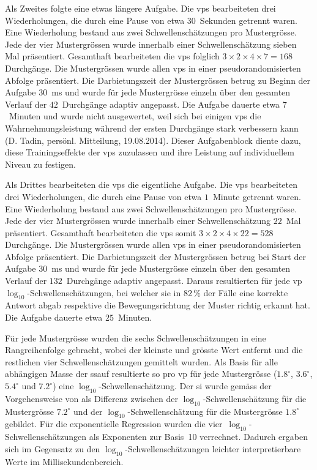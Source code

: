 \documentclass[11pt, twoside, a4paper]{book}		%
\begin{document}
Als Zweites folgte eine etwas längere Aufgabe. Die \glspl{vp} bearbeiteten drei Wiederholungen, die durch eine Pause von etwa $30$~Sekunden getrennt waren. Eine Wiederholung  bestand aus zwei Schwellenschätzungen pro Mustergrösse. Jede der vier Mustergrössen wurde innerhalb einer Schwellenschätzung sieben Mal präsentiert. Gesamthaft bearbeiteten die \glspl{vp} folglich $3 \times 2 \times 4 \times 7 = 168$ Durchgänge. Die Mustergrössen wurde allen \glspl{vp} in einer pseudorandomisierten Abfolge präsentiert. Die Darbietungszeit der Mustergrössen betrug zu Beginn der Aufgabe $30$~ms und wurde für jede Mustergrösse einzeln über den gesamten Verlauf der $42$~Durchgänge adaptiv angepasst. Die Aufgabe dauerte etwa $7$~Minuten und wurde nicht ausgewertet, weil sich bei einigen \glspl{vp} die Wahrnehmungsleistung während der ersten Durchgänge stark verbessern kann (D. Tadin, persönl. Mitteilung, 19.08.2014). Dieser Aufgabenblock diente dazu, diese Trainingseffekte der \glspl{vp} zuzulassen und ihre Leistung auf individuellem Niveau zu festigen. 

Als Drittes bearbeiteten die \glspl{vp} die eigentliche Aufgabe. Die \glspl{vp} bearbeiteten drei Wiederholungen, die durch eine Pause von etwa $1$~Minute getrennt waren. Eine Wiederholung  bestand aus zwei Schwellenschätzungen pro Mustergrösse. Jede der vier Mustergrössen wurde innerhalb einer Schwellenschätzung $22$~Mal präsentiert. Gesamthaft bearbeiteten die \glspl{vp} somit $3 \times 2 \times 4 \times 22 = 528$ Durchgänge. Die Mustergrössen wurde allen \glspl{vp} in einer pseudorandomisierten Abfolge präsentiert. Die Darbietungszeit der Mustergrössen betrug bei Start der Aufgabe $30$~ms und wurde für jede Mustergrösse einzeln über den gesamten Verlauf der $132$~Durchgänge adaptiv angepasst. Daraus resultierten für jede \gls{vp} $\log_{10}$-Schwel\-len\-schätz\-ungen, bei welcher sie in $82\,\%$ der Fälle eine korrekte Antwort abgab respektive die Bewegungsrichtung der Muster richtig erkannt hat.
Die Aufgabe dauerte etwa $25$~Minuten. 

Für jede Mustergrösse wurden die sechs Schwellenschätzungen in eine Rangreihenfolge gebracht, wobei der kleinste und grösste Wert entfernt und die restlichen  vier Schwellenschätzungen gemittelt wurden. Als Basis für alle abhängigen Masse der \gls{ssauf} resultierte so pro \gls{vp} für jede Mustergrösse ($1.8^{\circ}$, $3.6^{\circ}$, $5.4^{\circ}$ und $7.2^{\circ}$) eine $\log_{10}$-Schwellenschätzung.
Der \gls{si} wurde gemäss der Vorgehensweise von \citet{Melnick2013} als Differenz zwischen der $\log_{10}$-Schwellenschätzung für die Mustergrösse $7.2^{\circ}$ und der $\log_{10}$-Schwellenschätzung für die Mustergrösse $1.8^{\circ}$ gebildet. Für die exponentielle Regression wurden die vier~$\log_{10}$-Schwellen\-schätzungen als Exponenten zur Basis~10 verrechnet. Dadurch ergaben sich im Gegensatz zu den $\log_{10}$-Schwellen\-schätzungen leichter interpretierbare Werte im Millisekundenbereich.
\end{document}
